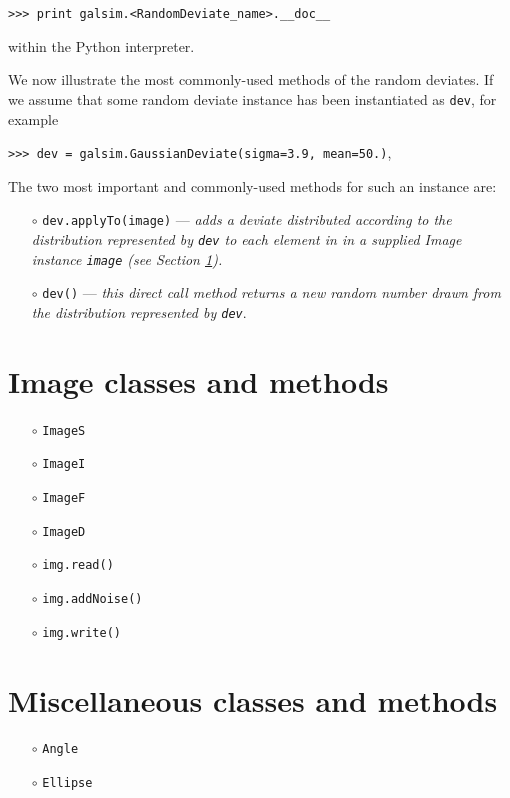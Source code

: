 \documentclass[preprint,11pt]{aastex}
\begin{document}
{\tt >>> print galsim.<RandomDeviate\_name>.\_\_doc\_\_}

within the Python interpreter.

We now illustrate the most commonly-used methods of the random deviates.
If we assume that some random deviate instance 
has been instantiated as \texttt{dev},  for example

{\tt >>> dev = galsim.GaussianDeviate(sigma=3.9, mean=50.)},

The two most important and commonly-used methods for such an
instance are:
\begin{itemize}

\item[$\circ$] \texttt{dev.applyTo(image)} --- \emph{adds a deviate
  distributed according to the distribution represented by 
\texttt{dev} to each element in in a supplied Image instance \texttt{image} (see Section \ref{sect:image}).}

\item[$\circ$] \texttt{dev()} --- \emph{this direct call method
    returns a new random number drawn from the distribution
    represented by \texttt{dev}}.

\end{itemize}

\section{Image classes and methods}\label{sect:image}

\begin{itemize}

\item[$\circ$] \texttt{ImageS}

\item[$\circ$] \texttt{ImageI}

\item[$\circ$] \texttt{ImageF}

\item[$\circ$] \texttt{ImageD}

\end{itemize}


\begin{itemize}

\item[$\circ$] \texttt{img.read()}

\item[$\circ$] \texttt{img.addNoise()}

\item[$\circ$] \texttt{img.write()}

\end{itemize}

\section{Miscellaneous classes and methods}\label{sect:misc}

\begin{itemize}

\item[$\circ$] \texttt{Angle}

\item[$\circ$] \texttt{Ellipse}

\end{itemize}
\end{document}
